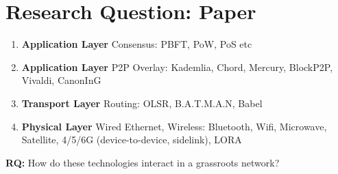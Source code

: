 \section{Research Question: Paper}
\begin{frame}
    \begin{enumerate}
        \item \textbf{Application Layer} Consensus: PBFT, PoW, PoS etc
        \item \textbf{Application Layer} P2P Overlay: Kademlia, Chord, Mercury, BlockP2P, Vivaldi, CanonInG
        \item \textbf{Transport Layer} Routing: OLSR, B.A.T.M.A.N, Babel
        \item \textbf{Physical Layer} Wired Ethernet, Wireless: Bluetooth, Wifi, Microwave, Satellite, 4/5/6G (device-to-device, sidelink), LORA

    \end{enumerate}

    \textbf{RQ: } How do these technologies interact in a grassroots network?
\end{frame}